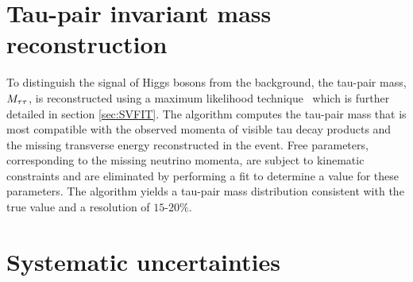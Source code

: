 \section{Tau-pair invariant mass reconstruction}

To distinguish the signal of Higgs bosons from the background, 
the tau-pair mass, $M_{\mathrm{\tau}\mathrm{\tau}}$, is reconstructed using a maximum 
likelihood technique~\cite{CMS-PAPER-HIG-10-002} which is further detailed
in section \ref{sec:SVFIT}. The algorithm 
computes the tau-pair mass that is most compatible with the observed 
momenta of visible tau decay products and the missing transverse energy 
reconstructed in the event. Free parameters, corresponding to the missing 
neutrino momenta, are subject to kinematic constraints and are eliminated 
by performing a fit to determine a value for these parameters. The algorithm yields a tau-pair mass distribution consistent 
with the true value and a resolution of $15$-$20\%$.

\section{Systematic uncertainties}

